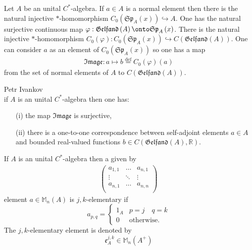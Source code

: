 \documentclass{beamer}
\theoremstyle{plain}
\newcommand{\be}{\begin{equation}}
\newcommand{\ee}{\end{equation}}
\newcommand{\bean}{\begin{eqnarray*}}
\newcommand{\eean}{\end{eqnarray*}}
\newcommand{\R}{\mathbb{R}}
\newcommand{\bydef}{\stackrel{\mathrm{def}}{=}}
\newcommand{\hookto}{\hookrightarrow}        %
\begin{document}
\begin{frame}
		Let $A$ be an unital $C^*$-algebra. If $a \in A$ is a normal element then there is the natural injective $*$-homomorphism $C_0\left( \mathfrak{Sp}_A\left(x \right)\right) \hookto A$. One has the natural surjective continuous map $\varphi : \mathfrak{Gelfand}\left(A  \right) \onto \mathfrak{Sp}_A\left(x \right)$. There is the natural injective $*$-homomorphism $C_0\left( \varphi\right): C_0\left( \mathfrak{Sp}_A\left(x \right)\right) \hookto C\left( \mathfrak{Gelfand}\left(A  \right)\right)$. One can consider $a$ as an element of  $C_0\left( \mathfrak{Sp}_A\left(x \right)\right)$ so one has a map
\bean
\mathfrak{Image}:	a \mapsto b \bydef C_0\left( \varphi\right)\left(a \right) 
\eean
from the set of normal elements of $A$ to $C\left( \mathfrak{Gelfand}\left(A  \right)\right)$. 

\begin{lemma}\alert{Petr Ivankov}\\if $A$ is an unital $C^*$-algebra then one has:
\begin{enumerate}
	\item [(i)]  the  map $\mathfrak{Image}$ is surjective,
	\item[(ii)] there is a one-to-one correspondence between  self-adjoint elements $a \in A$ and bounded real-valued functions $b \in  C\left( \mathfrak{Gelfand}\left(A  \right), \R\right)$.
\end{enumerate}
\end{lemma}
\end{frame}
\begin{frame}
	
\begin{definition}\label{elementary_defn}
	If $A$ is an unital  $C^*$-algebra then a given by 
	\bean
	\begin{pmatrix}
	a_{1,1}& \ldots & a_{n,1}  \\
	\vdots& \ddots & \vdots\\
	a_{n,1}& \ldots &a_{n,n} \\
\end{pmatrix}	
\eean 
 element $a\in 	 \mathbb{M}_n\left(A \right)$ is  $j,k$-\alert{elementary} if 
	\be\label{elementary_eqn}
	a_{p,q} = \begin{cases}
		1_A & p = j \quad q = k \\
		0 & \text{otherwise}.
	\end{cases}
	\ee
	The  $j,k$-{elementary} element is denoted by
	\be\label{elementary_jk_eqn}
	\mathfrak{e}^{j,k}_A\in \mathbb{M}_n\left(A^+ \right)
	\ee
	
\end{definition}
\end{frame}
\end{document}
